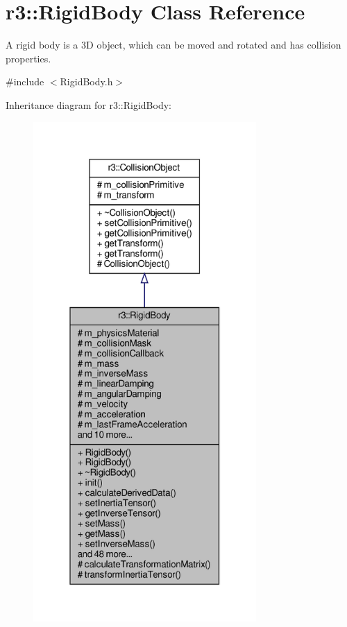 \hypertarget{classr3_1_1_rigid_body}{}\section{r3\+:\+:Rigid\+Body Class Reference}
\label{classr3_1_1_rigid_body}


A rigid body is a 3D object, which can be moved and rotated and has collision properties.  




{\ttfamily \#include $<$Rigid\+Body.\+h$>$}



Inheritance diagram for r3\+:\+:Rigid\+Body\+:\nopagebreak
\begin{figure}[H]
\begin{center}
\leavevmode
\includegraphics[width=241pt]{classr3_1_1_rigid_body__inherit__graph}
\end{center}
\end{figure}



